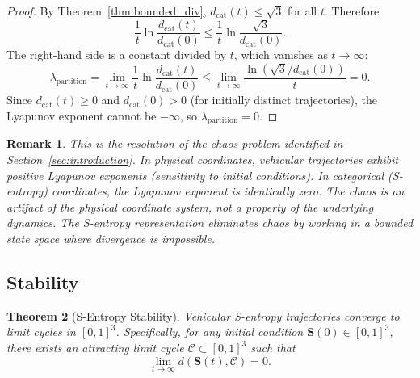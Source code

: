 \documentclass[twocolumn,10pt]{article}
\newtheorem{theorem}{Theorem}[section]
\newtheorem{remark}[theorem]{Remark}
\begin{document}
\begin{proof}
By Theorem~\ref{thm:bounded_div}, $d_{\mathrm{cat}}(t) \leq \sqrt{3}$ for all $t$. Therefore
\begin{equation}
\frac{1}{t} \ln \frac{d_{\mathrm{cat}}(t)}{d_{\mathrm{cat}}(0)} \leq \frac{1}{t} \ln \frac{\sqrt{3}}{d_{\mathrm{cat}}(0)}.
\end{equation}
The right-hand side is a constant divided by $t$, which vanishes as $t \to \infty$:
\begin{equation}
\lambda_{\mathrm{partition}} = \lim_{t \to \infty} \frac{1}{t} \ln \frac{d_{\mathrm{cat}}(t)}{d_{\mathrm{cat}}(0)} \leq \lim_{t \to \infty} \frac{\ln(\sqrt{3}/d_{\mathrm{cat}}(0))}{t} = 0.
\end{equation}
Since $d_{\mathrm{cat}}(t) \geq 0$ and $d_{\mathrm{cat}}(0) > 0$ (for initially distinct trajectories), the Lyapunov exponent cannot be $-\infty$, so $\lambda_{\mathrm{partition}} = 0$.
\end{proof}

\begin{remark}
This is the resolution of the chaos problem identified in Section~\ref{sec:introduction}. In physical coordinates, vehicular trajectories exhibit positive Lyapunov exponents (sensitivity to initial conditions). In categorical (S-entropy) coordinates, the Lyapunov exponent is identically zero. The chaos is an artifact of the physical coordinate system, not a property of the underlying dynamics. The S-entropy representation eliminates chaos by working in a bounded state space where divergence is impossible.
\end{remark}

\subsection{Stability}

\begin{theorem}[S-Entropy Stability]\label{thm:stability}
Vehicular S-entropy trajectories converge to limit cycles in $[0,1]^3$. Specifically, for any initial condition $\mathbf{S}(0) \in [0,1]^3$, there exists an attracting limit cycle $\mathcal{C} \subset [0,1]^3$ such that
\begin{equation}
\lim_{t \to \infty} d(\mathbf{S}(t), \mathcal{C}) = 0.
\end{equation}
\end{theorem}
\end{document}
